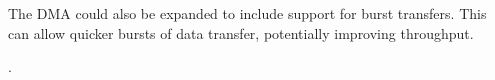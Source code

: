 The DMA could also be expanded to include support for burst transfers. This can allow quicker bursts of data
transfer, potentially improving throughput.

%
%


%
\cite{WBLibrary}.

